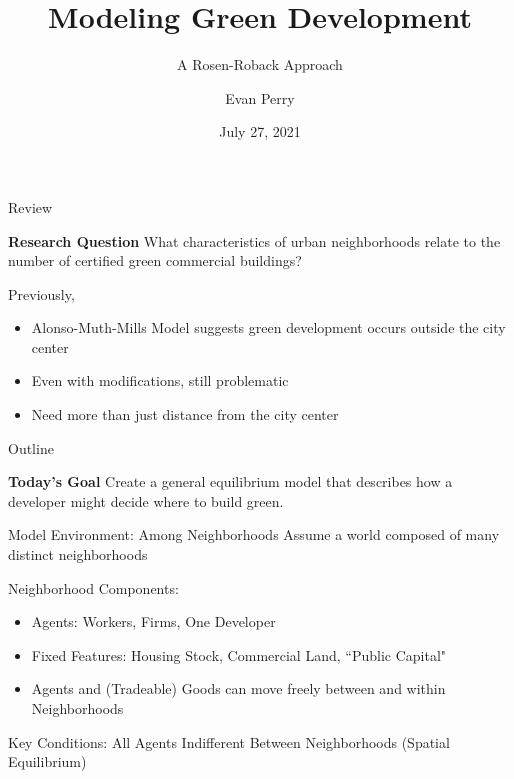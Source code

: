 \documentclass[11pt]{beamer}
\title{Modeling Green Development}
\subtitle{A Rosen-Roback Approach}
\institute{Spellman Program}
\author{Evan Perry}
\date{July 27, 2021}
\begin{document}
\maketitlepage

\begin{frame}{Review}

\begin{exampleblock}{\large\textbf{Research Question}}
What characteristics of urban neighborhoods relate to the number of certified green commercial buildings?
\end{exampleblock}

\vfill
Previously,
\begin{itemize}
	\item Alonso-Muth-Mills Model suggests green development occurs outside the city center
	\item Even with modifications, still problematic
	\item Need more than just distance from the city center
\end{itemize}

\end{frame}


\begin{frame}{Outline}

\begin{block}{\textbf{Today's Goal}}
Create a general equilibrium model that describes how a developer might decide where to build green. 
\end{block}

	\tableofcontents[hideallsubsections]
\end{frame}


\begin{frame}{Model Environment: Among Neighborhoods}
\small
Assume a world composed of many distinct neighborhoods

\vfill
Neighborhood Components:
\begin{itemize}
	\item Agents: Workers, Firms, One Developer
	\item Fixed Features: Housing Stock, Commercial Land, ``Public Capital"
	\item Agents and (Tradeable) Goods can move freely between and within Neighborhoods
\end{itemize}

\vfill
Key Conditions: All Agents Indifferent Between Neighborhoods (Spatial Equilibrium)

\end{frame}
\end{document}
